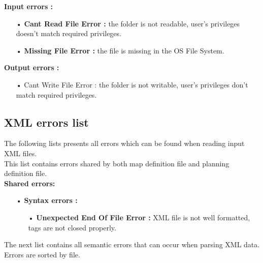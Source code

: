 \documentclass[paper=a4,fontsize=11pt]{report}
\numberwithin{equation}{section}		%
\numberwithin{figure}{section}		%
\numberwithin{table}{section}		%
\begin{document}
\textbf{Input errors :}
\begin{itemize}
  \item[•] \textbf{Cant Read File Error :} the folder is not readable, user’s privileges doesn’t match required privileges.
  \item[•] \textbf{Missing File Error :} the file is missing in the OS File System. \\
\end{itemize}

\textbf{Output errors :}
\begin{itemize}
  \item[•] Cant Write File Error : the folder is not writable, user’s privileges don’t match required privileges.  
\end{itemize}

\subsection{XML errors list}
\label{subsec:xml-errors-lists}

The following lists presents all errors which can be found when reading input XML files.\\

This list contains errors shared by both map definition file and planning definition file.\\

\textbf{Shared errors:}
\begin{itemize}
  \item[•] \textbf{Syntax errors :}
  \begin{itemize}
    \item[•] \textbf{Unexpected End Of File Error :} XML file is not well formatted, tags are not closed properly.\\
  \end{itemize}
\end{itemize}

The next list contains all semantic errors that can occur when parsing XML data. Errors are sorted by file.\\ 
\end{document}

